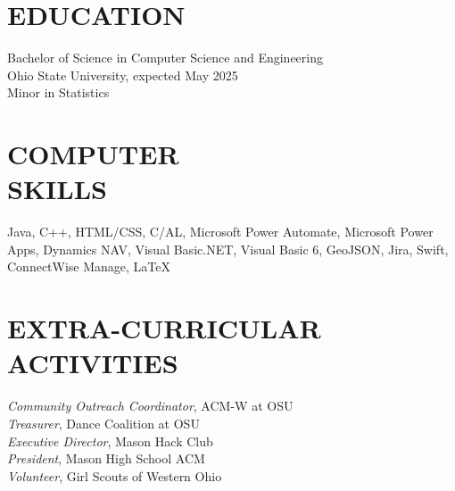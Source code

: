 \documentclass[margin]{res}
\begin{document}
\begin{resume}
\section{EDUCATION} Bachelor of Science in Computer Science and Engineering\\
                Ohio State University, expected May 2025 \\
                Minor in Statistics
                
 
 
\section{COMPUTER \\ SKILLS} Java, C++, HTML/CSS, C/AL, Microsoft Power Automate, Microsoft Power Apps, Dynamics NAV, Visual Basic.NET, Visual Basic 6, GeoJSON, Jira, Swift, ConnectWise Manage, \LaTeX


\section{EXTRA-CURRICULAR \\ ACTIVITIES}             
            \textit {Community Outreach Coordinator}, ACM-W at OSU\\
            \textit {Treasurer}, Dance Coalition at OSU\\
            \textit {Executive Director}, Mason Hack Club\\
            \textit {President}, Mason High School ACM\\
            \textit {Volunteer}, Girl Scouts of Western Ohio
 

\end{resume}
\end{document}
